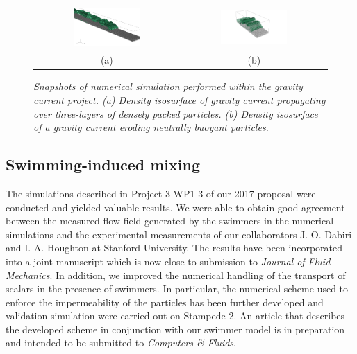 \documentclass[11pt]{article}
\begin{document}
\begin{figure}
\centering
\begin{tabular}{cc}
\includegraphics[trim = 30px 180px 30px 50px, clip, width=0.48\textwidth]{figures/iiso0-1_L3h15_t110000.png} &
\includegraphics[trim = 250px 180px 350px 50px, clip, width=0.48\textwidth]{figures/E4_0044.png}\\
(a) & (b)
\end{tabular}
\caption{\small \textit{Snapshots of numerical simulation performed within the gravity current project. (a) Density isosurface of gravity current propagating over three-layers of densely packed particles. (b) Density isosurface of a gravity current eroding neutrally buoyant particles. }}
\label{fig:erosion}
\end{figure}


\subsection*{Swimming-induced mixing}
The simulations described in Project 3 WP1-3 of our 2017 proposal were conducted and yielded valuable results. We were able to obtain good agreement between the measured flow-field generated by the swimmers in the numerical simulations and the experimental measurements of our collaborators J. O. Dabiri and I. A. Houghton at Stanford University. The results have been incorporated into a joint manuscript which is now close to submission to \emph{Journal of Fluid Mechanics}. In addition, we improved the numerical handling of the transport of scalars in the presence of swimmers. In particular, the  numerical scheme used to enforce the impermeability of the particles has been further developed and validation simulation were carried out on Stampede 2. An article that describes the developed scheme in conjunction with our swimmer model is in preparation and intended to be submitted to \emph{Computers \& Fluids}.\\
\end{document}
